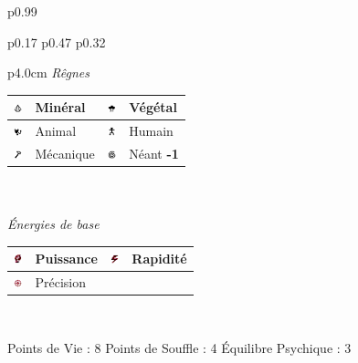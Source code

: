 \documentclass[11pt,twoside,a4paper]{article}
\def\imgMINER{\includegraphics[width=0.25cm]{../../../../../imgGraphics/rolePlayingGame/SimulacreS/mini12x12/mineral.png} }
\def\imgVEGET{\includegraphics[width=0.25cm]{../../../../../imgGraphics/rolePlayingGame/SimulacreS/mini12x12/vegetal.png} }
\def\imgANIMA{\includegraphics[width=0.25cm]{../../../../../imgGraphics/rolePlayingGame/SimulacreS/mini12x12/animal.png} }
\def\imgHUMAI{\includegraphics[width=0.25cm]{../../../../../imgGraphics/rolePlayingGame/SimulacreS/mini12x12/humain.png} }
\def\imgMECAN{\includegraphics[width=0.25cm]{../../../../../imgGraphics/rolePlayingGame/SimulacreS/mini12x12/mecanique.png} }
\def\imgNEANT{\includegraphics[width=0.25cm]{../../../../../imgGraphics/rolePlayingGame/SimulacreS/mini12x12/neant.png} }
\def\imgPUISS{\includegraphics[width=0.25cm]{../../../../../imgGraphics/rolePlayingGame/SimulacreS/mini12x12/puissance.png} }
\def\imgRAPID{\includegraphics[width=0.25cm]{../../../../../imgGraphics/rolePlayingGame/SimulacreS/mini12x12/rapidite.png} }
\def\imgPRECI{\includegraphics[width=0.25cm]{../../../../../imgGraphics/rolePlayingGame/SimulacreS/mini12x12/precision.png} }
\begin{document}
\begin{longtable}[ht]{ p{} }
\begin{tabular}[h]{ p{} p{} p{} }
			\begin{tabular}[h]{ p{4.0cm} }
				\emph{R{\^e}gnes}  \\
				{\footnotesize %
				\begin{tabular}[h]{|p{0.25cm}|p{1.50cm}|p{0.25cm}|p{1.50cm}|}
					\hline
					\imgMINER 	& Min{\'e}ral		\newline 0	 & \imgVEGET	& V{\'e}g{\'e}tal		\newline 0					\\
					\hline
					\imgANIMA 	& Animal			\newline 0	 & \imgHUMAI	& Humain				\newline 2					\\
					\hline
					\imgMECAN	& M{\'e}canique		\newline 1	 & \imgNEANT	& N{\'e}ant				\newline \textbf{-1}		\\ 
					\hline
				\end{tabular} } \\
				\\
				\emph{{\'E}nergies de base} \\
				{\footnotesize %
				\begin{tabular}[h]{|p{0.25cm}|p{1.50cm}|p{0.25cm}|p{1.50cm}|}
					\hline
					\imgPUISS	& Puissance			\newline 1	 & \imgRAPID	& Rapidit{\'e}			\newline 1				\\
					\hline
					\imgPRECI	& Pr{\'e}cision		\newline 1	 &				&												\\
					\hline
				\end{tabular} } \\
			\end{tabular}
			\newline \newline \newline 
			Points de Vie : 8			\newline
			Points de Souffle : 4		\newline
			{\'E}quilibre Psychique : 3	\newline
		\\ %

\end{tabular}
\end{longtable}
\end{document}
